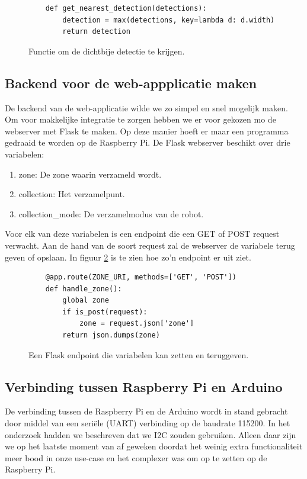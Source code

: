\begin{figure}[H]
    \centering
    \begin{verbatim}
    def get_nearest_detection(detections):
        detection = max(detections, key=lambda d: d.width)
        return detection
    \end{verbatim}
    \caption{Functie om de dichtbije detectie te krijgen.}
    \label{fig:get_nearest_detection}
\end{figure}

\subsection{Backend voor de web-appplicatie maken}
De backend van de web-applicatie wilde we zo simpel en snel mogelijk maken. Om voor makkelijke integratie te zorgen hebben we er voor gekozen mo de webserver met Flask \cite{Flask} te maken. Op deze manier hoeft er maar een programma gedraaid te worden op de Raspberry Pi. De Flask webserver beschikt over drie variabelen:\\

\begin{enumerate}
    \item zone: De zone waarin verzameld wordt.
    \item collection: Het verzamelpunt.
    \item collection\_mode: De verzamelmodus van de robot.
\end{enumerate}

Voor elk van deze variabelen is een endpoint die een GET of POST request verwacht. Aan de hand van de soort request zal de webserver de variabele terug geven of opslaan. In figuur \ref{fig:handle_zone} is te zien hoe zo'n endpoint er uit ziet.\\

\begin{figure}[H]
    \centering
    \begin{verbatim}
    @app.route(ZONE_URI, methods=['GET', 'POST'])
    def handle_zone():
        global zone
        if is_post(request):
            zone = request.json['zone']
        return json.dumps(zone)
    \end{verbatim}
    \caption{Een Flask endpoint die variabelen kan zetten en teruggeven.}
    \label{fig:handle_zone}
\end{figure}

\subsection{Verbinding tussen Raspberry Pi en Arduino}
De verbinding tussen de Raspberry Pi en de Arduino wordt in stand gebracht door middel van een seriële (UART) verbinding op de baudrate 115200. In het onderzoek hadden we beschreven dat we I2C zouden gebruiken. Alleen daar zijn we op het laatste moment van af geweken doordat het weinig extra functionaliteit meer bood in onze use-case en het complexer was om op te zetten op de Raspberry Pi. \\

